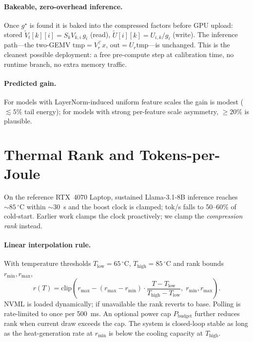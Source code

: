 \documentclass[11pt]{article}
\begin{document}
\paragraph{Bakeable, zero-overhead inference.}  Once $g^\star$ is found it
is baked into the compressed factors before GPU upload: stored
$\widetilde V_t[k][i]=S_kV_{k,i}\,g_i$ (read), $\widetilde
U[i][k]=U_{i,k}/g_i$ (write).  The inference path---the two-GEMV
$\mathrm{tmp}=V_r^\top x$, $\mathrm{out}=U_r\mathrm{tmp}$---is unchanged.
This is the cleanest possible deployment: a free pre-compute step at
calibration time, no runtime branch, no extra memory traffic.

\paragraph{Predicted gain.}  For models with LayerNorm-induced uniform
feature scales the gain is modest ($\lesssim 5\%$ tail energy); for models
with strong per-feature scale asymmetry, $\geq 20\%$ is plausible.

\section{Thermal Rank and Tokens-per-Joule}
\label{sec:thermal}
On the reference RTX~4070 Laptop, sustained Llama-3.1-8B inference reaches
$\sim 85\,^\circ\mathrm{C}$ within $\sim 30$~s and the boost clock is
clamped; tok/s falls to 50--60\% of cold-start.  Earlier work clamps the
clock proactively; we clamp the \emph{compression rank} instead.

\paragraph{Linear interpolation rule.}
With temperature thresholds $T_\text{low}{=}65\,^\circ\mathrm{C}$,
$T_\text{high}{=}85\,^\circ\mathrm{C}$ and rank bounds $r_\text{min},r_\text{max}$,
\[
r(T)=\mathrm{clip}\!\left(r_\text{max}-(r_\text{max}-r_\text{min})\cdot
\frac{T-T_\text{low}}{T_\text{high}-T_\text{low}},\;r_\text{min},r_\text{max}\right).
\]
NVML is loaded dynamically; if unavailable the rank reverts to base.
Polling is rate-limited to once per 500~ms.  An optional power cap
$P_\text{budget}$ further reduces rank when current draw exceeds the cap.
The system is closed-loop stable as long as the heat-generation rate at
$r_\text{min}$ is below the cooling capacity at $T_\text{high}$.
\end{document}
